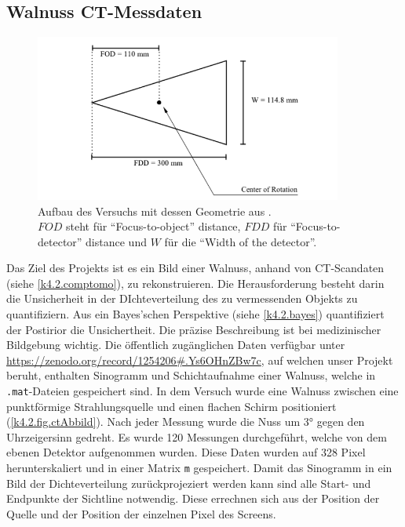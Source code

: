 \subsection{Walnuss CT-Messdaten}\label{k4.2.ct.walnuss}
\begin{figure}[htb]
	\centering
	\includegraphics[width=0.9\textwidth]{k4.2/geometry.png}
	\caption{Aufbau des Versuchs mit dessen Geometrie aus \textcite{k4.2.art.walnutXRay}.\\
	$FOD$ steht für \enquote{Focus-to-object} distance, $FDD$ für \enquote{Focus-to-detector} distance und $W$ für die \enquote{Width of the detector}.
	}
	\label{k4.2.fig.geo}
\end{figure}

Das Ziel des Projekts ist es ein Bild einer Walnuss, anhand von CT-Scandaten (siehe \cref{k4.2.comptomo}), zu rekonstruieren. Die Herausforderung besteht darin die Unsicherheit in der DIchteverteilung des zu vermessenden Objekts zu quantifiziern. Aus ein Bayes'schen Perspektive (siehe \cref{k4.2.bayes}) quantifiziert der Postirior die Unsichertheit. Die präzise Beschreibung ist bei medizinischer Bildgebung wichtig.
Die öffentlich zugänglichen Daten verfügbar unter \url{https://zenodo.org/record/1254206#.Ys6OHnZBw7c}, auf welchen unser Projekt beruht, enthalten Sinogramm und Schichtaufnahme einer Walnuss, welche in \verb|.mat|-Dateien gespeichert sind.
In dem Versuch wurde eine Walnuss zwischen eine punktförmige Strahlungsquelle und einen flachen Schirm positioniert (\cref{k4.2.fig.ctAbbild}). Nach jeder Messung wurde die Nuss um 3° gegen den Uhrzeigersinn gedreht.
Es wurde 120 Messungen durchgeführt, welche von dem ebenen Detektor aufgenommen wurden. Diese Daten wurden auf 328 Pixel herunterskaliert und in einer Matrix \verb|m| gespeichert.
 Damit das Sinogramm in ein Bild der Dichteverteilung zurückprojeziert werden kann sind alle Start- und Endpunkte der Sichtline notwendig. Diese errechnen sich aus der Position der Quelle und der Position der einzelnen Pixel des Screens.\\


